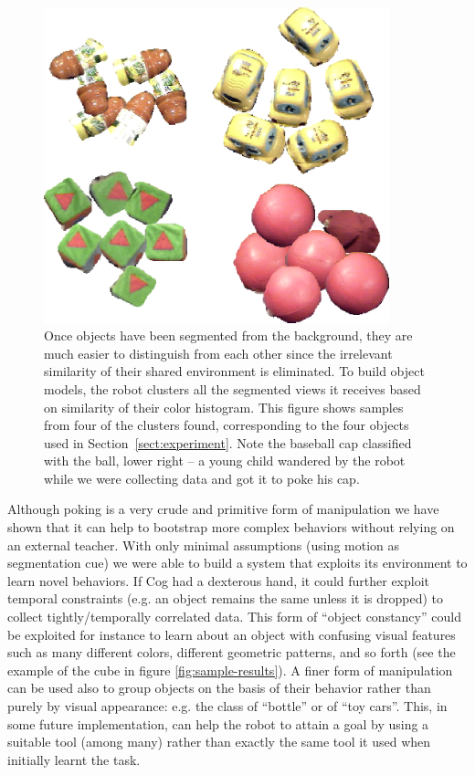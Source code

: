 \begin{figure}[tbh]
\begin{center}
\includegraphics[width=10cm]{fig-object-clusters2.eps}
\caption{ 
\label{fig:objects-clusters}
%
Once objects have been segmented from the background, they are much
easier to distinguish from each other since the irrelevant similarity
of their shared environment is eliminated.  To build object models,
the robot clusters all the segmented views it receives based on
similarity of their color histogram.  This figure shows samples from
four of the clusters found, corresponding to the four objects used in
Section~\ref{sect:experiment}.  Note the baseball cap classified with
the ball, lower right -- a young child wandered by the robot while we
were collecting data and got it to poke his cap.
%
}
\end{center}
\end{figure}

Although poking is a very crude and primitive form of manipulation we have
shown that it can help to bootstrap more complex behaviors without relying on 
an external teacher. With only minimal assumptions (using motion as segmentation
cue) we were able to build a system that exploits its environment to 
learn novel behaviors. If Cog had a dexterous hand, it could further
exploit temporal constraints (e.g. an object remains the same unless it is dropped)
to collect tightly/temporally correlated data. This form of ``object constancy'' could be 
exploited for instance to learn about an object with confusing visual features such
as many different colors, different geometric patterns, and so forth  
(see the example of the cube in figure \ref{fig:sample-results}). A finer form of manipulation can be
used also to group objects on the basis of their behavior rather than purely
by visual appearance: e.g. the class of ``bottle'' or of ``toy cars''.
This, in some future implementation, can help the robot to attain a goal by using
a suitable tool (among many) rather than exactly the same tool it used
when initially learnt the task.

